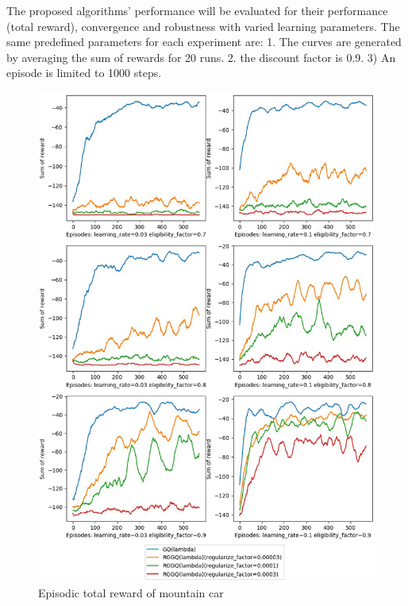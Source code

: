 \documentclass[conference]{IEEEtran}
\begin{document}
The proposed algorithms' performance will be evaluated for their performance (total reward), convergence and robustness with varied learning parameters. The same predefined parameters for each experiment are: 1. The curves are generated  by averaging the sum of rewards for 20 runs. 2. the discount factor is 0.9. 3) An episode is limited to 1000 steps.
\begin{figure}[ht]
  \centering
  \includegraphics[scale=0.3]{TotalRewardMountainCar.jpg}
  \caption{Episodic total reward of mountain car}
  \label{fig2}
\end{figure}
\end{document}
